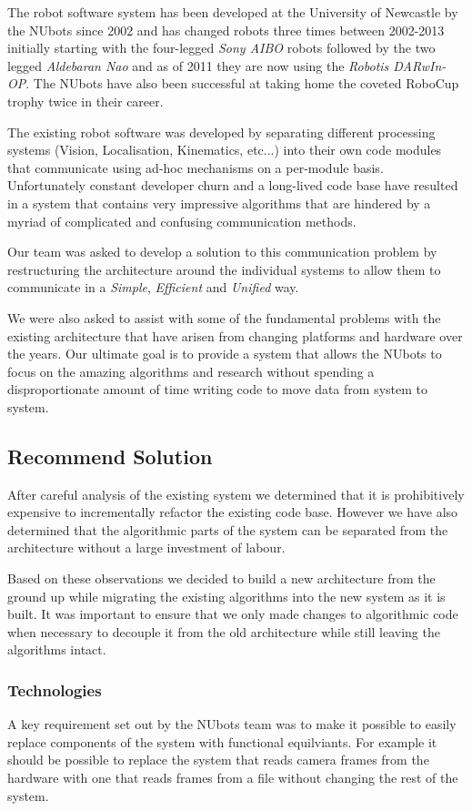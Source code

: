 \documentclass[english,12pt]{scrartcl}
\begin{document}
			The robot software system has been developed at the University of Newcastle by the NUbots since 2002 and has changed robots three times between 2002-2013 initially starting with the four-legged \emph{Sony AIBO} robots followed by the two legged \emph{Aldebaran Nao} and as of 2011 they are now using the \emph{Robotis DARwIn-OP}.
			The NUbots have also been successful at taking home the coveted RoboCup trophy twice in their career.
			
			The existing robot software was developed by separating different processing systems (Vision, Localisation, Kinematics, etc...) into their own code modules that communicate using ad-hoc mechanisms on a per-module basis. 
			Unfortunately constant developer churn and a long-lived code base have resulted in a system that contains very impressive algorithms that are hindered by a myriad of complicated and confusing communication methods.
			
			Our team was asked to develop a solution to this communication problem by restructuring the architecture around the individual systems to allow them to communicate in a \emph{Simple}, \emph{Efficient} and \emph{Unified} way. 
			
			We were also asked to assist with some of the fundamental problems with the existing architecture that have arisen from changing platforms and hardware over the years. 
			Our ultimate goal is to provide a system that allows the NUbots to focus on the amazing algorithms and research without spending a disproportionate amount of time writing code to move data from system to system.
				
		\subsection{Recommend Solution}
			After careful analysis of the existing system we determined that it is prohibitively expensive to incrementally refactor the existing code base.
			However we have also determined that the algorithmic parts of the system can be separated from the architecture without a large investment of labour. 
			
			Based on these observations we decided to build a new architecture from the ground up while migrating the existing algorithms into the new system as it is built.
			It was important to ensure that we only made changes to algorithmic code when necessary to decouple it from the old architecture while still leaving the algorithms intact.
			
			\subsubsection{Technologies}
				A key requirement set out by the NUbots team was to make it possible to easily replace components of the system with functional equilviants. 
				For example it should be possible to replace the system that reads camera frames from the hardware with one that reads frames from a file without changing the rest of the system.
				
\end{document}
